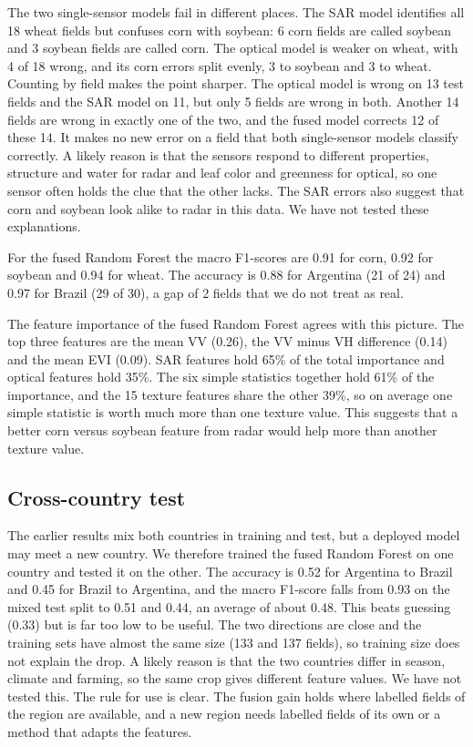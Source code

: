 \documentclass[conference]{IEEEtran}
\begin{document}
The two single-sensor models fail in different places. The SAR model identifies all 18 wheat fields but confuses corn with soybean: 6 corn fields are called soybean and 3 soybean fields are called corn. The optical model is weaker on wheat, with 4 of 18 wrong, and its corn errors split evenly, 3 to soybean and 3 to wheat. Counting by field makes the point sharper. The optical model is wrong on 13 test fields and the SAR model on 11, but only 5 fields are wrong in both. Another 14 fields are wrong in exactly one of the two, and the fused model corrects 12 of these 14. It makes no new error on a field that both single-sensor models classify correctly. A likely reason is that the sensors respond to different properties, structure and water for radar and leaf color and greenness for optical, so one sensor often holds the clue that the other lacks. The SAR errors also suggest that corn and soybean look alike to radar in this data. We have not tested these explanations.

For the fused Random Forest the macro F1-scores are 0.91 for corn, 0.92 for soybean and 0.94 for wheat. The accuracy is 0.88 for Argentina (21 of 24) and 0.97 for Brazil (29 of 30), a gap of 2 fields that we do not treat as real.

The feature importance of the fused Random Forest agrees with this picture. The top three features are the mean VV (0.26), the VV minus VH difference (0.14) and the mean EVI (0.09). SAR features hold 65\% of the total importance and optical features hold 35\%. The six simple statistics together hold 61\% of the importance, and the 15 texture features share the other 39\%, so on average one simple statistic is worth much more than one texture value. This suggests that a better corn versus soybean feature from radar would help more than another texture value.

\subsection{Cross-country test}
The earlier results mix both countries in training and test, but a deployed model may meet a new country. We therefore trained the fused Random Forest on one country and tested it on the other. The accuracy is 0.52 for Argentina to Brazil and 0.45 for Brazil to Argentina, and the macro F1-score falls from 0.93 on the mixed test split to 0.51 and 0.44, an average of about 0.48. This beats guessing (0.33) but is far too low to be useful. The two directions are close and the training sets have almost the same size (133 and 137 fields), so training size does not explain the drop. A likely reason is that the two countries differ in season, climate and farming, so the same crop gives different feature values. We have not tested this. The rule for use is clear. The fusion gain holds where labelled fields of the region are available, and a new region needs labelled fields of its own or a method that adapts the features.
\end{document}
